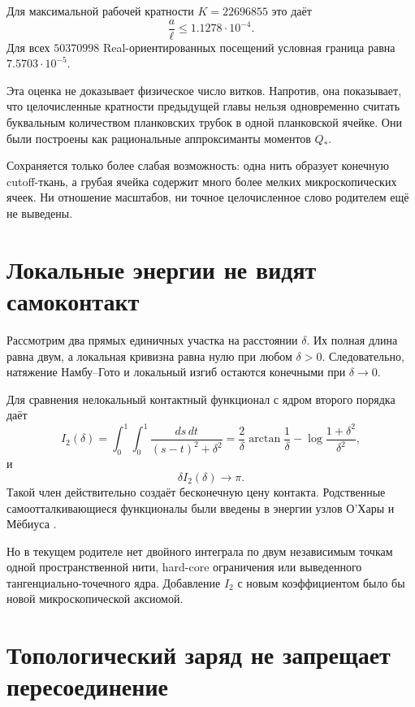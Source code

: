 Для максимальной рабочей кратности $K=22696855$ это даёт
\begin{equation}
 \frac a\ell\leq1.1278\cdot10^{-4}.
\end{equation}
Для всех $50370998$ Real-ориентированных посещений условная граница равна
$7.5703\cdot10^{-5}$.

Эта оценка не доказывает физическое число витков. Напротив, она показывает,
что целочисленные кратности предыдущей главы нельзя одновременно считать
буквальным количеством планковских трубок в одной планковской ячейке.
Они были построены как рациональные аппроксиманты моментов $Q_*$.

Сохраняется только более слабая возможность: одна нить образует конечную
cutoff-ткань, а грубая ячейка содержит много более мелких микроскопических
ячеек. Ни отношение масштабов, ни точное целочисленное слово родителем ещё
не выведены.

\section{Локальные энергии не видят самоконтакт}

Рассмотрим два прямых единичных участка на расстоянии $\delta$. Их полная
длина равна двум, а локальная кривизна равна нулю при любом $\delta>0$.
Следовательно, натяжение Намбу--Гото и локальный изгиб остаются конечными
при $\delta\to0$.

Для сравнения нелокальный контактный функционал с ядром второго порядка
даёт
\begin{equation}
 I_2(\delta)
 =\int_0^1\!\!\int_0^1
 \frac{ds\,dt}{(s-t)^2+\delta^2}
 =\frac{2}{\delta}\arctan\frac1\delta
 -\log\frac{1+\delta^2}{\delta^2},
\end{equation}
и
\begin{equation}
 \delta I_2(\delta)\longrightarrow\pi.
\end{equation}
Такой член действительно создаёт бесконечную цену контакта. Родственные
самоотталкивающиеся функционалы были введены в энергии узлов О'Хары и
Мёбиуса \cite{single-thread-ohara1991,single-thread-freedman-he-wang1994}.

Но в текущем родителе нет двойного интеграла по двум независимым точкам
одной пространственной нити, hard-core ограничения или выведенного
тангенциально-точечного ядра. Добавление $I_2$ с новым коэффициентом было
бы новой микроскопической аксиомой.

\section{Топологический заряд не запрещает пересоединение}

